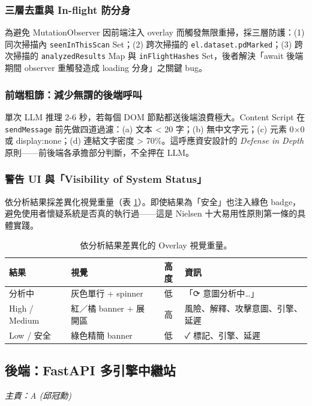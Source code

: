 \documentclass[11pt, a4paper]{article}
\begin{document}
\subsubsection{三層去重與 In-flight 防分身}
為避免 MutationObserver 因前端注入 overlay 而觸發無限重掃，採三層防護：(1) 同次掃描內 \texttt{seenInThisScan} Set；(2) 跨次掃描的 \texttt{el.dataset.pdMarked}；(3) 跨次掃描的 \texttt{analyzedResults} Map 與 \texttt{inFlightHashes} Set，後者解決「await 後端期間 observer 重觸發造成 loading 分身」之關鍵 bug。

\subsubsection{前端粗篩：減少無謂的後端呼叫}\label{sec:prefilter}
單次 LLM 推理 2-6 秒，若每個 DOM 節點都送後端浪費極大。Content Script 在 \texttt{sendMessage} 前先做四道過濾：(a) 文本 \textless{} 20 字；(b) 無中文字元；(c) 元素 0$\times$0 或 display:none；(d) 連結文字密度 \textgreater{} 70\%。這呼應資安設計的 \textit{Defense in Depth} 原則——前後端各承擔部分判斷，不全押在 LLM。

\subsubsection{警告 UI 與「Visibility of System Status」}
依分析結果採差異化視覺重量（表 \ref{tab:ui}）。即使結果為「安全」也注入綠色 badge，避免使用者懷疑系統是否真的執行過——這是 Nielsen 十大易用性原則第一條的具體實踐\cite{nielsen1994}。

\begin{table}[h]
  \centering
  \small
  \begin{tabularx}{\textwidth}{l l c X}
    \toprule
    \textbf{結果} & \textbf{視覺} & \textbf{高度} & \textbf{資訊} \\
    \midrule
    分析中    & 灰色單行 + spinner & 低 & 「⟳ 意圖分析中…」 \\
    High / Medium & 紅／橘 banner + 展開區 & 高 & 風險、解釋、攻擊意圖、引擎、延遲 \\
    Low / 安全 & 綠色精簡 banner & 低 & ✓ 標記、引擎、延遲 \\
    \bottomrule
  \end{tabularx}
  \caption{依分析結果差異化的 Overlay 視覺重量。}
  \label{tab:ui}
\end{table}

\subsection{後端：FastAPI 多引擎中繼站} \label{sec:backend}
\textit{主責：A (邱冠勳)}
\end{document}

